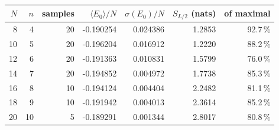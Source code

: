 \begin{tabular}{r r r r r r r}
\toprule
$N$ & $n$ & samples & $\langle E_0\rangle/N$ & $\sigma(E_0)/N$ & $S_{L/2}$ (nats) & of maximal \\
\midrule
8 & 4 & 20 & -0.190254 & 0.024386 & 1.2853 & 92.7\,\% \\
10 & 5 & 20 & -0.196204 & 0.016912 & 1.2220 & 88.2\,\% \\
12 & 6 & 20 & -0.191363 & 0.010831 & 1.5799 & 76.0\,\% \\
14 & 7 & 20 & -0.194852 & 0.004972 & 1.7738 & 85.3\,\% \\
16 & 8 & 10 & -0.194124 & 0.004404 & 2.2482 & 81.1\,\% \\
18 & 9 & 10 & -0.191942 & 0.004013 & 2.3614 & 85.2\,\% \\
20 & 10 & 5 & -0.189291 & 0.001344 & 2.8017 & 80.8\,\% \\
\bottomrule
\end{tabular}
